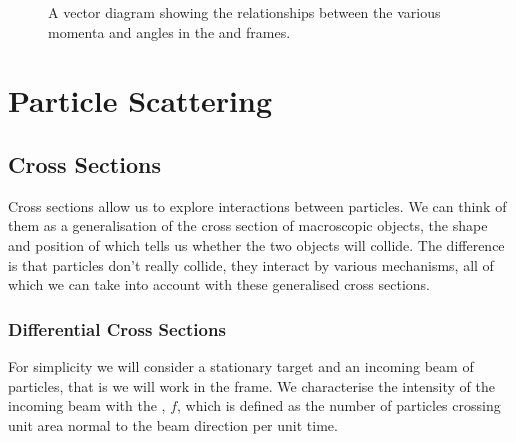     \begin{figure}
        \caption{A vector diagram showing the relationships between the various momenta and angles in the \protect\LAB{} and \protect\CM{} frames.}
        \label{fig:scattering vector diagram}
    \end{figure}
    
    \chapter{Particle Scattering}
    \section{Cross Sections}
    Cross sections allow us to explore interactions between particles.
    We can think of them as a generalisation of the cross section of macroscopic objects, the shape and position of which tells us whether the two objects will collide.
    The difference is that particles don't really collide, they interact by various mechanisms, all of which we can take into account with these generalised cross sections.
    
    \subsection{Differential Cross Sections}
    For simplicity we will consider a stationary target and an incoming beam of particles, that is we will work in the \LAB{} frame.
    We characterise the intensity of the incoming beam with the , \(f\), which is defined as the number of particles crossing unit area normal to the beam direction per unit time.
    
